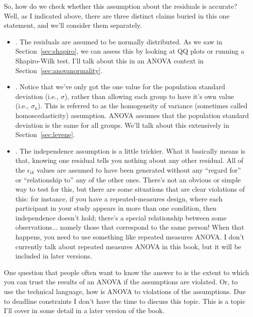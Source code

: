 So, how do we check whether this assumption about the residuals is accurate? Well, as I indicated above, there are three distinct claims buried in this one statement, and we'll consider them separately.
\begin{itemize}
\item {}. The residuals are assumed to be normally distributed. As we saw in Section~\ref{sec:shapiro}, we can assess this by looking at QQ plots or running a Shapiro-Wilk test. I'll talk about this in an ANOVA context in Section~\ref{sec:anovanormality}. 
\item {}. Notice that we've only got the one value for the population standard deviation (i.e., $\sigma$), rather than allowing each group to have it's own value (i.e., $\sigma_k$). This is referred to as the homogeneity of variance (sometimes called homoscedasticity) assumption. ANOVA assumes that the population standard deviation is the same for all groups. We'll talk about this extensively in Section~\ref{sec:levene}. 
\item {}. The independence assumption is a little trickier. What it basically means is that, knowing one residual tells you nothing about any other residual. All of the $\epsilon_{ik}$ values are assumed to have been generated without any ``regard for'' or ``relationship to'' any of the other ones. There's not an obvious or simple way to test for this, but there are some situations that are clear violations of this: for instance, if you have a repeated-measures design, where each participant in your study appears in more than one condition, then independence doesn't hold; there's a special relationship between some observations... namely those that correspond to the same person! When that happens, you need to use something like repeated measures ANOVA. I don't currently talk about repeated measures ANOVA in this book, but it will be included in later versions. 
\end{itemize}


One question that people often want to know the answer to is the extent to which you can trust the results of an ANOVA if the assumptions are violated. Or, to use the technical language, how  is ANOVA to violations of the assumptions. Due to deadline constraints I don't have the time to discuss this topic. This is a topic I'll cover in some detail in a later version of the book. 

